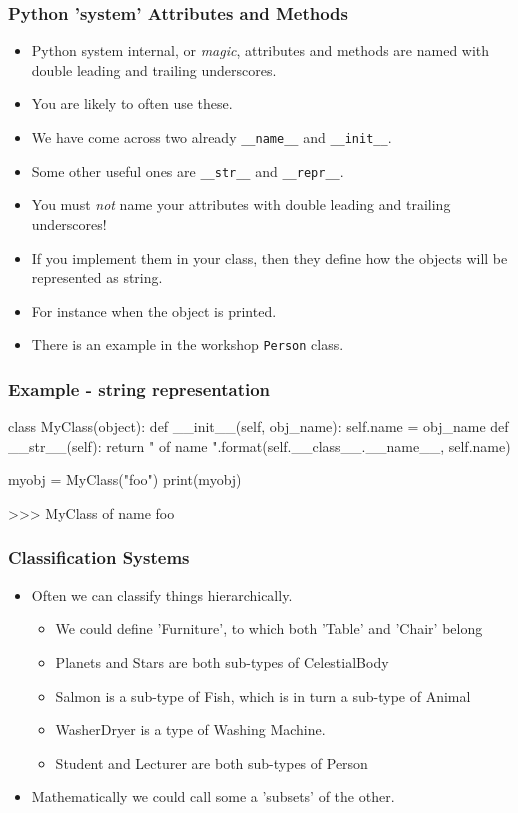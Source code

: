 \documentclass{beamer}
\begin{document}
\begin{frame}[fragile]
\frametitle{Python 'system' Attributes and Methods}
\begin{itemize}
\item Python system internal, or \emph{magic}, attributes and methods are
named with double leading and trailing underscores.
\item You are likely to often use these.
\item We have come across two already \lstinline|__name__| and \lstinline|__init__|.
\item Some other useful ones are \lstinline|__str__| and \lstinline|__repr__|.
\item You must \emph{not} name your attributes with double leading and trailing underscores!
\item If you implement them in your class, then they define how the objects will be represented as string.
\item For instance when the object is printed.
\item There is an example in the workshop \lstinline|Person| class.
\end{itemize}
\end{frame}

\begin{frame}[fragile]
\frametitle{Example - string representation}
\begin{code}
class MyClass(object):
  def __init__(self, obj_name):
    self.name = obj_name
  def __str__(self):
    return "{} of name {}".format(self.__class__.__name__, 
                              self.name)
                              
myobj = MyClass("foo")
print(myobj)

>>> MyClass of name foo

\end{code}
\end{frame}


\begin{frame}[fragile]
\frametitle{Classification Systems}
\begin{itemize}
\item Often we can classify things hierarchically.
\begin{itemize}
\item We could define 'Furniture', to which both 'Table' and 'Chair' belong
\item Planets and Stars are both sub-types of CelestialBody
\item Salmon is a sub-type of Fish, which is in turn a sub-type of Animal
\item WasherDryer is a type of Washing Machine.
\item Student and Lecturer are both sub-types of Person
\end{itemize}
\item Mathematically we could call some a 'subsets' of the other.
\end{itemize}

\end{frame}
\end{document}
